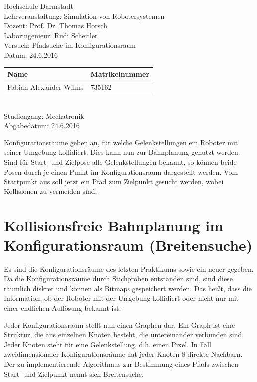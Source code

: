 \documentclass[11pt, a4paper]{article}
\date{\today}
\begin{document}
\begin{center}
{\Huge Hochschule Darmstadt} \\
\vspace{0.5cm}
Lehrveranstaltung: Simulation von Robotersystemen \\
Dozent: Prof. Dr. Thomas Horsch \\
Laboringenieur: Rudi Scheitler \\
Versuch: Pfadsuche im Konfigurationsraum\\
Datum: 24.6.2016 \\
\vfill
\renewcommand{\arraystretch}{2}
	\begin{tabular}{| l | l |}
	\hline
	Name & Matrikelnummer \\ \hline
	Fabian Alexander Wilms & 735162 \\ \hline
	\end{tabular} \\
\vspace{0.5cm}
Studiengang: Mechatronik \\
Abgabedatum: 24.6.2016 \\
\renewcommand{\arraystretch}{1}
\end{center}
\newpage
\tableofcontents
\newpage
Konfigurationsräume geben an, für welche Gelenkstellungen ein Roboter mit seiner Umgebung kollidiert. Dies kann nun zur Bahnplanung genutzt werden. Sind für Start- und Zielpose alle Gelenkstellungen bekannt, so können beide  Posen durch je einen Punkt im Konfigurationsraum dargestellt werden. Vom Startpunkt aus soll jetzt ein Pfad zum Zielpunkt gesucht werden, wobei Kollisionen zu vermeiden sind.

\section{Kollisionsfreie Bahnplanung im Konfigurationsraum (Breitensuche)}
Es sind die Konfigurationsräume des letzten Praktikums sowie ein neuer gegeben. Da die Konfigurationsräume durch Stichproben entstanden sind, sind diese räumlich diskret und können als Bitmaps gespeichert werden. Das heißt, dass die Information, ob der Roboter mit der Umgebung kollidiert oder nicht nur mit einer endlichen Auflösung bekannt ist.

Jeder Konfigurationsraum stellt nun einen Graphen dar. Ein Graph ist eine Struktur, die aus einzelnen Knoten besteht, die untereinander verbunden sind. Jeder Knoten steht für eine Gelenkstellung, d.h. einen Pixel. In Fall zweidimensionaler Konfigurationsräume hat jeder Knoten 8 direkte Nachbarn. Der zu implementierende Algorithmus zur Bestimmung eines Pfads zwischen Start- und Zielpunkt nennt sich Breitensuche.
\end{document}
